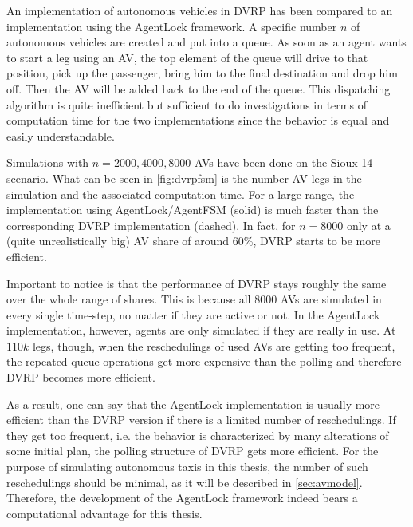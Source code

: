 An implementation of autonomous vehicles in DVRP has been compared to an implementation
using the AgentLock framework. A specific number $n$ of
autonomous vehicles are created and put into a queue. As soon as an agent wants to
start a leg using an AV, the top element of the queue will drive to that position,
pick up the passenger, bring him to the final destination and drop him off. Then
the AV will be added back to the end of the queue. This dispatching algorithm is
quite inefficient but sufficient to do investigations in terms
of computation time for the two implementations since the behavior is equal and
easily understandable.

Simulations with $n=2000, 4000, 8000$ AVs have been done on the Sioux-14 scenario. What can be seen in \cref{fig:dvrpfsm}
is the number AV legs in the simulation and the associated computation
time. For a large range, the implementation using AgentLock/AgentFSM (solid)
is much faster than the corresponding DVRP implementation (dashed). In fact, for $n=8000$
only at a (quite unrealistically big) AV share of around 60\%, DVRP starts to be more efficient.

Important to notice is that the performance of DVRP stays roughly the same over
the whole range of shares. This is because all 8000 AVs are simulated
in every single time-step, no matter if they are active or not. In the AgentLock
implementation, however, agents are only simulated if they are really in use. At
$110k$ legs, though, when the reschedulings of used AVs are getting too frequent, the repeated
queue operations get more expensive than the polling and therefore DVRP becomes more efficient.

As a result, one can say that the AgentLock implementation is usually more efficient
than the DVRP version if there is a limited number of reschedulings. If they get
too frequent, i.e. the behavior is characterized by many alterations of some
initial plan, the polling structure of DVRP gets more efficient. For the purpose
of simulating autonomous taxis in this thesis, the number of such reschedulings
should be minimal, as it will be described in \cref{sec:avmodel}. Therefore, the
development of the AgentLock framework indeed bears a computational advantage for
this thesis.

